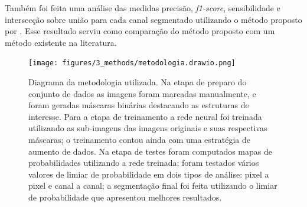 Também foi feita uma análise das medidas precisão, \textit{f1-score}, sensibilidade e intersecção sobre união para cada canal segmentado utilizando o método proposto por \cite{gondim2021automatic}. Esse resultado serviu como comparação do método proposto com um método existente na literatura.




\begin{landscape}

\begin{figure}[h]
    \center
    \texttt{[image: figures/3\_methods/metodologia.drawio.png]}   
  
    \caption[Diagrama do método proposto.]{Diagrama da metodologia utilizada. Na etapa de preparo do conjunto de dados as imagens foram marcadas manualmente, e foram geradas máscaras binárias destacando as estruturas de interesse. Para a etapa de treinamento a rede neural foi treinada utilizando as sub-imagens das imagens originais e suas respectivas máscaras; o treinamento contou ainda com uma estratégia de aumento de dados. Na etapa de testes foram computados mapas de probabilidades utilizando a rede treinada; foram testados vários valores de limiar de probabilidade em dois tipos de análise: pixel a pixel e canal a canal; a segmentação final foi feita utilizando o limiar de probabilidade que apresentou melhores resultados. }
    \label{fig:aug-examples}
\end{figure}

\end{landscape}